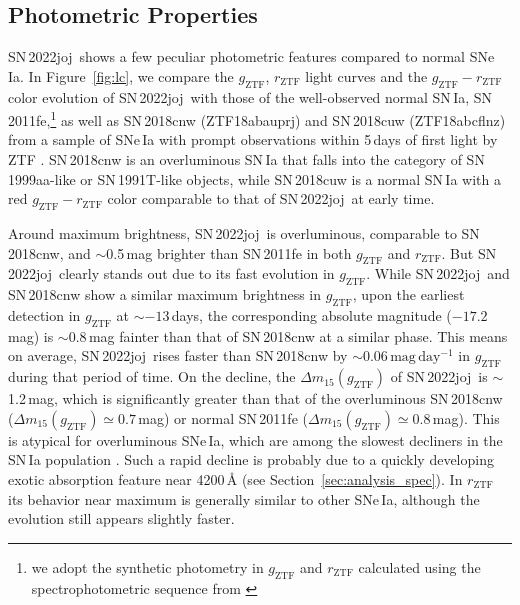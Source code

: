 \documentclass[twocolumn]{aastex631}
\newcommand{\sn}{SN\,2022joj}
\begin{document}
\begin{CJK*}{UTF8}{gbsn}
\subsection{Photometric Properties} \label{sec:analysis_phot}
\sn\ shows a few peculiar photometric features compared to normal SNe\,Ia. In Figure~\ref{fig:lc}, we compare the $g_\mathrm{ZTF}$, $r_\mathrm{ZTF}$ light curves and the $g_\mathrm{ZTF} - r_\mathrm{ZTF}$ color evolution of \sn\ with those of the well-observed normal SN\,Ia, SN\,2011fe,\footnote{we adopt the synthetic photometry in $g_\mathrm{ZTF}$ and $r_\mathrm{ZTF}$ calculated using the spectrophotometric sequence from \citet{Pereira_2013}} as well as SN\,2018cnw (ZTF18abauprj) and SN\,2018cuw (ZTF18abcflnz) from a sample of SNe\,Ia with prompt observations within 5\,days of first light by ZTF \citep{Yao_2019,Bulla2020}. 
SN\,2018cnw is an overluminous SN\,Ia that falls into the category of SN\,1999aa-like \citep[99aa-like;][]{Garavini_99aa_2004} or SN\,1991T-like \citep[91T-like;][]{Filippenko_91T_1992} objects, while SN\,2018cuw is a normal SN\,Ia with a red $g_\mathrm{ZTF} - r_\mathrm{ZTF}$ color comparable to that of \sn\ at early time. 

Around maximum brightness, \sn\ is overluminous, comparable to SN\,2018cnw, and $\sim$0.5\,mag brighter than SN\,2011fe in both $g_\mathrm{ZTF}$ and $r_\mathrm{ZTF}$. But \sn\ clearly stands out due to its fast evolution in $g_\mathrm{ZTF}$. While \sn\ and SN\,2018cnw show a similar maximum brightness in $g_\mathrm{ZTF}$, upon the earliest detection in $g_\mathrm{ZTF}$ at $\sim$$-13$\,days, the corresponding absolute magnitude ($-17.2$\,mag) is $\sim$0.8\,mag fainter than that of SN\,2018cnw at a similar phase. This means on average, \sn\ rises faster than SN\,2018cnw by $\sim$$0.06\,\mathrm{mag\,day^{-1}}$ in $g_\mathrm{ZTF}$ during that period of time. On the decline, the $\Delta m_{15}(g_\mathrm{ZTF})$ of \sn\ is $\sim$1.2\,mag, which is significantly greater than that of the overluminous SN\,2018cnw ($\Delta m_{15}(g_\mathrm{ZTF})\simeq0.7$\,mag) or normal SN\,2011fe ($\Delta m_{15}(g_\mathrm{ZTF})\simeq0.8$\,mag). This is atypical for overluminous SNe\,Ia, which are among the slowest decliners in the SN\,Ia population \citep{Phillips_1999, Taubenberger_2017}. Such a rapid decline is probably due to a quickly developing exotic absorption feature near 4200\,\r{A} (see Section~\ref{sec:analysis_spec}). In $r_\mathrm{ZTF}$ its behavior near maximum is generally similar to other SNe\,Ia, although the evolution still appears slightly faster.


\end{CJK*}
\end{document}
